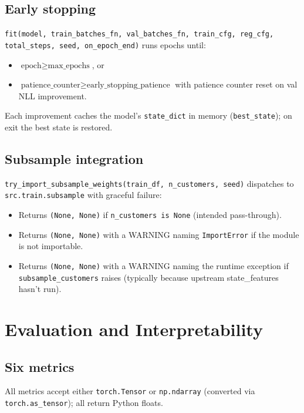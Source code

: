 \documentclass[11pt,a4paper]{article}
\begin{document}
\subsection{Early stopping}

\texttt{fit(model, train\_batches\_fn, val\_batches\_fn, train\_cfg,
reg\_cfg, total\_steps, seed, on\_epoch\_end)} runs epochs until:
\begin{itemize}
\item $\text{epoch} \ge \text{max\_epochs}$, or
\item $\text{patience\_counter} \ge \text{early\_stopping\_patience}$
with patience counter reset on val NLL improvement.
\end{itemize}
Each improvement caches the model's \texttt{state\_dict} in memory
(\texttt{best\_state}); on exit the best state is restored.

\subsection{Subsample integration}

\texttt{try\_import\_subsample\_weights(train\_df, n\_customers,
seed)} dispatches to \texttt{src.train.subsample} with graceful
failure:
\begin{itemize}
\item Returns \texttt{(None, None)} if \texttt{n\_customers is None}
(intended pass-through).
\item Returns \texttt{(None, None)} with a WARNING naming
\texttt{ImportError} if the module is not importable.
\item Returns \texttt{(None, None)} with a WARNING naming the runtime
exception if \texttt{subsample\_customers} raises (typically
because upstream state\_features hasn't run).
\end{itemize}

\section{Evaluation and Interpretability}
\label{sec:eval}

\subsection{Six metrics}

All metrics accept either \texttt{torch.Tensor} or \texttt{np.ndarray}
(converted via \texttt{torch.as\_tensor}); all return Python floats.
\end{document}
